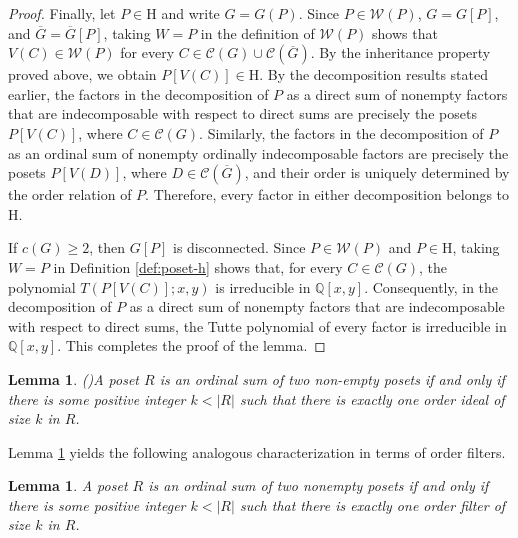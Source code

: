 \documentclass[10pt,a4paper]{amsart}
\newtheorem{lemma}[theorem]{Lemma}
\begin{document}
\begin{proof}
Finally, let $P\in\mathrm H$ and write $G=G(P)$.
Since $P\in\mathcal W(P)$, $G=G[P]$, and $\overline G=\overline G[P]$,
taking $W=P$ in the definition of $\mathcal W(P)$ shows that $V(C)\in\mathcal W(P)$ 
for every $C\in\mathcal C(G)\cup\mathcal C(\overline G)$.
By the inheritance property proved above, we obtain $P[V(C)]\in\mathrm H$.
By the decomposition results stated earlier, the factors in the decomposition of $P$ 
as a direct sum of nonempty factors that are indecomposable with respect
to direct sums are precisely the posets $P[V(C)]$, where $C\in\mathcal C(G)$.
Similarly, the factors in the decomposition of $P$ as an ordinal sum 
of nonempty ordinally indecomposable factors are precisely the posets $P[V(D)]$,
where $D\in\mathcal C(\overline G)$,
and their order is uniquely determined by the order relation of $P$.
Therefore, every factor in either decomposition belongs to $\mathrm H$.

If $c(G)\geq 2$, then $G[P]$ is disconnected. Since $P\in\mathcal W(P)$ and $P\in\mathrm H$,
taking $W=P$ in Definition \ref{def:poset-h} shows that,  for every $C\in\mathcal C(G)$,
the polynomial $T(P[V(C)];x,y)$ is irreducible in $\mathbb Q[x,y]$.
Consequently, in the decomposition of $P$ as a direct sum of nonempty factors 
that are indecomposable with respect to direct sums, 
the Tutte polynomial of every factor is irreducible in $\mathbb Q[x,y]$.
This completes the proof of the lemma.
\end{proof}

\begin{lemma}(\cite{Gordon1996})\label{lem:leantichain}
A poset $R$ is an ordinal sum of two non-empty posets if and only if 
there is some positive integer $k < |R|$ such that 
there is exactly one order ideal of size $k$ in $R$.
\end{lemma}

Lemma \ref{lem:leantichain} yields the following analogous
characterization in terms of order filters.

\begin{lemma}\label{lem:unique-filter}
A poset $R$ is an ordinal sum of two nonempty posets if and only if 
there is some positive integer $k<|R|$ such that 
there is exactly one order filter of size $k$ in $R$.
\end{lemma}
\end{document}
